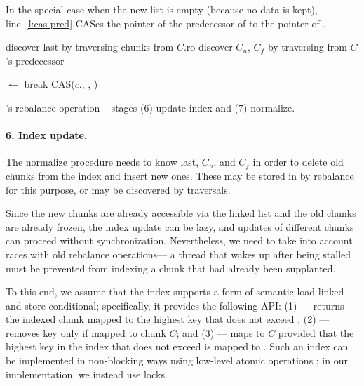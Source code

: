 In the special case when the new list is empty (because no data is kept), line~\ref{l:cas-pred} CASes  the  pointer of the predecessor of  to the   pointer of .


\begin{algorithm}[th]
\begin{algorithmic}
	\State discover  last by traversing chunks from $C$.ro
	\State discover $C_n$, $C_f$ by traversing from $C$'s predecessor
	
			\State {}
	\EndFor
	
		\Do
			\State {} $\leftarrow$ 
			 break \EndIf 
	\EndFor		
		\State CAS($c$., , )
	\EndFor		
	\EndProcedure
\end{algorithmic}
\caption{\kiwi's rebalance operation -- stages (6) update index and (7) normalize.}
\label{alg:rebalance-normal}
\end{algorithm}	

\paragraph{6. Index update.}
The normalize procedure needs to know last, $C_n$, and $C_f$ in order to delete old chunks from the index and insert new ones. These may be stored in  by rebalance for this purpose, or may be discovered by traversals. 

Since the new chunks are already accessible via the linked list and the old chunks are already frozen, the index update can be lazy, and updates of different chunks can proceed without synchronization.
Nevertheless, we need to take into account races with old rebalance operations--- a thread that wakes up after being stalled must be prevented from indexing a chunk that had already been supplanted.

To this end, we assume that the index supports a form of semantic load-linked and store-conditional; specifically, it provides the following API:
(1)  --- returns the indexed chunk mapped to the highest key that does not exceed ;
(2)  --- removes key  only if mapped to chunk $C$; and
(3)  --- maps  to $C$ provided that the highest key in the index that does not exceed
 is mapped to .
Such an index can be implemented in non-blocking ways using low-level atomic operations \cite{BraginskyP2012}; in our implementation,
we instead use locks.

